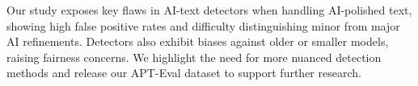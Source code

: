 
Our study exposes key flaws in AI-text detectors when handling AI-polished text, showing high false positive rates and difficulty distinguishing minor from major AI refinements. Detectors also exhibit biases against older or smaller models, raising fairness concerns. We highlight the need for more nuanced detection methods and release our APT-Eval dataset to support further research.